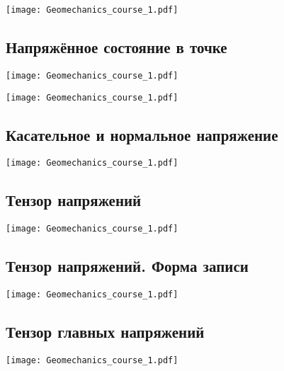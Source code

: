 \documentclass[main.tex]{subfiles}
\begin{document}
\begin{center}
\texttt{[image: Geomechanics\_course\_1.pdf]}
\end{center}

\subsection{Напряжённое состояние в точке}

\begin{center}
\texttt{[image: Geomechanics\_course\_1.pdf]}
\end{center}

\begin{center}
\texttt{[image: Geomechanics\_course\_1.pdf]}
\end{center}

\subsection{Касательное и нормальное напряжение}

\begin{center}
\texttt{[image: Geomechanics\_course\_1.pdf]}
\end{center}

\subsection{Тензор напряжений}

\begin{center}
\texttt{[image: Geomechanics\_course\_1.pdf]}
\end{center}

\subsection{Тензор напряжений. Форма записи}

\begin{center}
\texttt{[image: Geomechanics\_course\_1.pdf]}
\end{center}

\subsection{Тензор главных напряжений}

\begin{center}
\texttt{[image: Geomechanics\_course\_1.pdf]}
\end{center}
\end{document}
